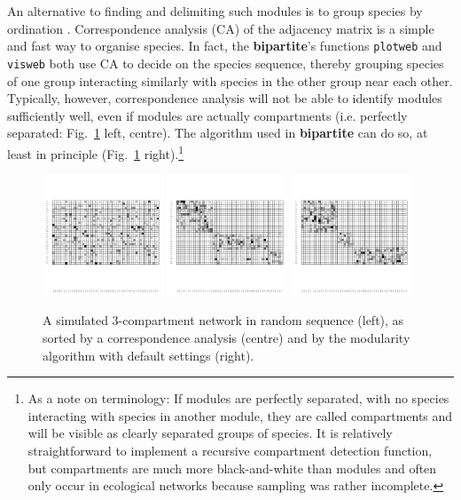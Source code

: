 \documentclass[a4paper, 11pt]{article}\usepackage[]{graphicx}\usepackage[]{color}
\newcommand{\package}[1]{\textbf{#1}}
\begin{document}
An alternative to finding and delimiting such modules is to group species by ordination \citep{Borgatti1997,Lewinsohn2006}. Correspondence analysis (CA) of the adjacency matrix is a simple and fast way to organise species. In fact, the \package{bipartite}'s functions \texttt{plotweb} and \texttt{visweb} both use CA to decide on the species sequence, thereby grouping species of one group interacting similarly with species in the other group near each other. 
Typically, however, correspondence analysis will not be able to identify modules sufficiently well, even if modules are actually compartments (i.e. perfectly separated: Fig.~\ref{fig:randomCAsorted} left, centre). The algorithm used in \package{bipartite} can do so, at least in principle (Fig.~\ref{fig:randomCAsorted} right).\footnote{As a note on terminology: If modules are perfectly separated, with no species interacting with species in another module, they are called compartments and will be visible as clearly separated groups of species. It is relatively straightforward to implement a recursive compartment detection function, but compartments are much more black-and-white than modules and often only occur in ecological networks because sampling was rather incomplete.}
\begin{figure}
	\hfill
	\includegraphics[width=0.32\textwidth, trim=1cm 4cm 0.5cm 1cm, clip=TRUE]{figures/random_small_high_nonoise}
	\hfill
	\includegraphics[width=0.32\textwidth, trim=1cm 4cm 0.5cm 1cm, clip=TRUE]{figures/CA_small_high_nonoise}
	\hfill
	\includegraphics[width=0.32\textwidth, trim=1cm 4cm 0.5cm 1cm, clip=TRUE]{figures/sorted_small_high_nonoise}
	\hfill
	\caption{A simulated 3-compartment network in random sequence (left), as sorted by a correspondence analysis (centre) and by the modularity algorithm with default settings (right).}
\label{fig:randomCAsorted}
\end{figure}
\end{document}

